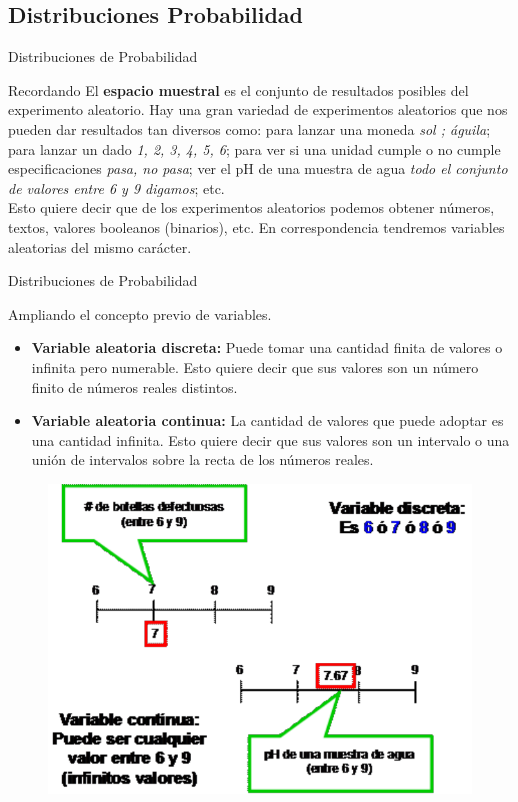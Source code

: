 \documentclass[11pt]{beamer}
\begin{document}
      \subsection*{Distribuciones Probabilidad}
        \begin{frame}{Distribuciones de Probabilidad}
            \begin{block}{Recordando}
              El \textbf{espacio muestral} \pause es el conjunto de resultados posibles del experimento aleatorio. Hay una gran variedad de experimentos aleatorios que nos pueden dar resultados tan diversos como: para lanzar una moneda  \textit{{sol ; águila}}; para lanzar un dado  \textit{{1, 2, 3, 4, 5, 6}}; para ver si una unidad cumple o no cumple especificaciones \textit{{pasa, no pasa}}; ver el pH de una muestra de agua \textit{{todo el conjunto de valores entre 6 y 9 digamos}}; etc. \\
              \pause
              Esto quiere decir que de los experimentos aleatorios podemos obtener números, textos, valores booleanos (binarios), etc. En correspondencia tendremos variables aleatorias del mismo carácter.\\
            \end{block}
        \end{frame}


        \begin{frame}{Distribuciones de Probabilidad}
            \begin{block}{Ampliando el concepto previo de variables.}
                \begin{itemize}
                    \item \textbf{Variable aleatoria discreta:} Puede tomar una cantidad finita de valores o infinita pero numerable. Esto quiere decir que sus valores son un número finito de números reales distintos.
                    \item  \textbf{Variable aleatoria continua:} La cantidad de valores que puede adoptar es una cantidad infinita. Esto quiere decir que sus valores son un intervalo o una unión de intervalos sobre la recta de los números reales.
                \end{itemize}
            \end{block}
            \begin{figure}
                \centering
                \includegraphics[width=0.3\linewidth]{images/estadistica8}
                \label{fig:estadistica8}
            \end{figure}

        \end{frame}
\end{document}
